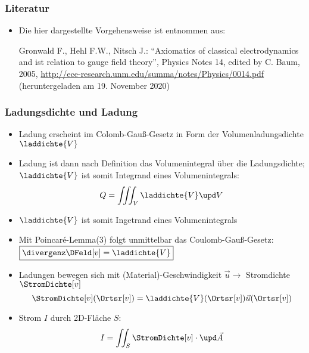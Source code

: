 \begin{frame}
  \frametitle{Literatur}
\begin{itemize}[<+->]
\item Die hier dargestellte Vorgehensweise ist entnommen aus:
  \bigskip
  
  Gronwald F., Hehl F.W., Nitsch J.: \enquote{Axiomatics of classical electrodynamics and ist relation to gauge field theory}, Physics Notes 14, edited by C. Baum, 2005, \url{http://ece-research.unm.edu/summa/notes/Physics/0014.pdf} (heruntergeladen am 19. November 2020)
\end{itemize}
\end{frame}


\begin{frame}
  \frametitle{Ladungsdichte und Ladung}
\begin{itemize}[<+->]
\item Ladung erscheint im Colomb-Gauß-Gesetz in Form der Volumenladungsdichte \(\laddichte{V} \)
\item Ladung ist dann nach Definition das Volumenintegral über die Ladungsdichte; \(\laddichte{V} \) ist somit Integrand eines Volumenintegrals:
  \begin{equation*}
    Q = \iiint_V \laddichte{V} \upd V
  \end{equation*}
\item<0> \(\laddichte{V} \) ist somit Ingetrand eines Volumenintegrals
  \item<0> Mit Poincaré-Lemma(3) folgt unmittelbar das Coulomb-Gauß-Gesetz: \( \boxed{\divergenz\DFeld[v] = \laddichte{V} }\)
  \item<0> Ladungen bewegen sich mit (Material)-Geschwindigkeit \(\vec{u} \to\) Stromdichte \(\StromDichte[v]\)
    \begin{equation*}
\StromDichte[v](\Ortsr[v]) = \laddichte{V}(\Ortsr[v])\vec{u}(\Ortsr[v])
\end{equation*}
\item<0> Strom \(I\) durch 2D-Fläche \(S\):
  \begin{equation*}
    I = \iint_S \StromDichte[v] \cdot \upd\vec{A}
    \end{equation*}

    
\end{itemize}
\end{frame}


